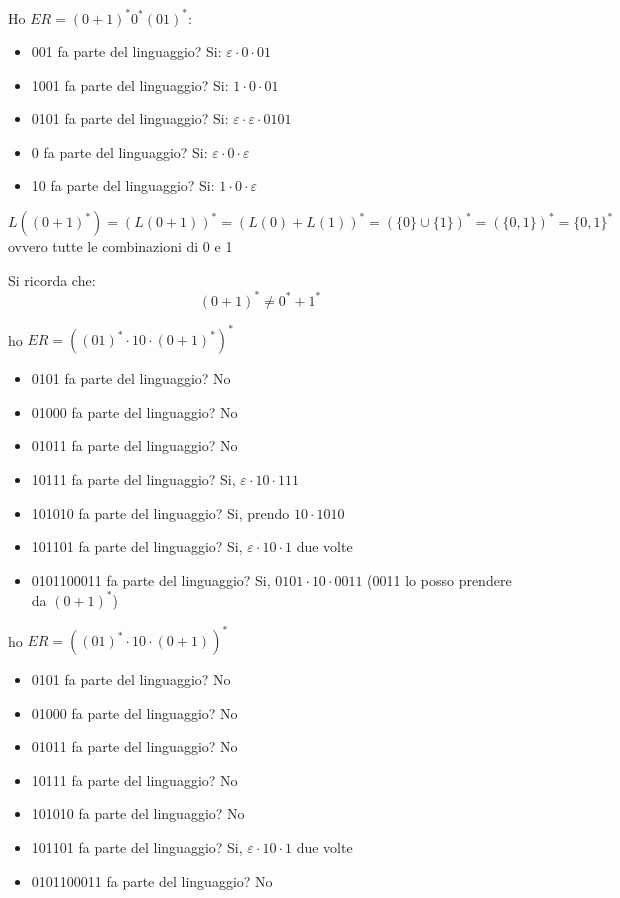 \begin{example}
	Ho $ER=(0+1)^*0^*(01)^*$:
	\begin{itemize}
		\item 001 fa parte del linguaggio? Si: $\varepsilon\cdot 0\cdot 01$
		\item 1001 fa parte del linguaggio? Si: $1\cdot 0\cdot 01$
		\item 0101 fa parte del linguaggio? Si: $\varepsilon\cdot\varepsilon \cdot 0101$
		\item 0 fa parte del linguaggio? Si: $\varepsilon\cdot 0\cdot \varepsilon$
		\item 10 fa parte del linguaggio? Si: $1\cdot 0\cdot \varepsilon$
	\end{itemize}
	$$L((0+1)^*)=(L(0+1))^*=(L(0)+L(1))^*=(\{0\}\cup \{1\})^*=(\{0,1\})^*=\{0,1\}^*$$
	ovvero tutte le combinazioni di 0 e 1
\end{example}
Si ricorda che:
$$(0+1)^*\neq 0^*+1^*$$
\newpage
\begin{example}
	ho $ER=((01)^*\cdot 10\cdot (0+1)^*)^*$
	\begin{itemize}
		\item 0101 fa parte del linguaggio? No
		\item 01000 fa parte del linguaggio? No
		\item 01011 fa parte del linguaggio? No
		\item 10111 fa parte del linguaggio? Si, $\varepsilon\cdot 10\cdot 111$
		\item 101010 fa parte del linguaggio? Si, prendo $10\cdot 1010$
		\item 101101 fa parte del linguaggio? Si, $\varepsilon\cdot 10\cdot 1$ due volte
		\item 0101100011 fa parte del linguaggio? Si, $0101\cdot 10\cdot 0011$ (0011 lo posso prendere da $(0+1)^*$)
	\end{itemize}
\end{example}
\begin{example}
	ho $ER=((01)^*\cdot 10\cdot (0+1))^*$
	\begin{itemize}
		\item 0101 fa parte del linguaggio? No
		\item 01000 fa parte del linguaggio? No
		\item 01011 fa parte del linguaggio? No
		\item 10111 fa parte del linguaggio? No
		\item 101010 fa parte del linguaggio? No
		\item 101101 fa parte del linguaggio? Si, $\varepsilon\cdot 10\cdot 1$ due volte
		\item 0101100011 fa parte del linguaggio? No
	\end{itemize}
\end{example}
